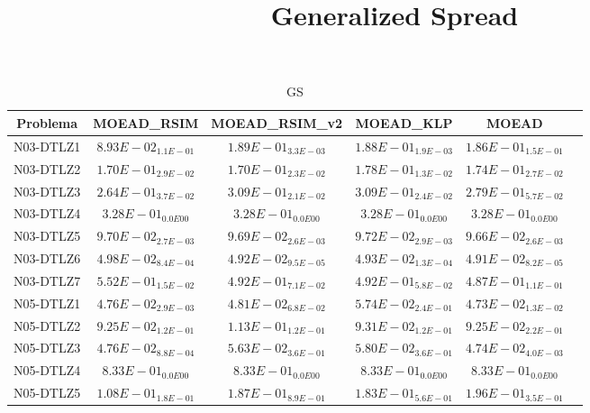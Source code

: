 \documentclass{article}
\title{Generalized Spread}
\author{}
\begin{document}
\maketitle
\begin{table*}[ht!]
\scriptsize
\caption{GS}
\centering\begin{tabular}{|c||c||c||c||c||c|} \hline
Problema &MOEAD_RSIM &MOEAD_RSIM_v2 &MOEAD_KLP &MOEAD\\\hline
N03-DTLZ1 &\cellcolor{gray95}$8.93E-02_{1.1E-01}$ &$1.89E-01_{3.3E-03}$ &$1.88E-01_{1.9E-03}$ &\cellcolor{gray25}$1.86E-01_{1.5E-01}$\\ 
\hline
N03-DTLZ2 &\cellcolor{gray95}$1.70E-01_{2.9E-02}$ &\cellcolor{gray25}$1.70E-01_{2.3E-02}$ &$1.78E-01_{1.3E-02}$ &$1.74E-01_{2.7E-02}$\\ 
\hline
N03-DTLZ3 &\cellcolor{gray95}$2.64E-01_{3.7E-02}$ &$3.09E-01_{2.1E-02}$ &$3.09E-01_{2.4E-02}$ &\cellcolor{gray25}$2.79E-01_{5.7E-02}$\\ 
\hline
N03-DTLZ4 &\cellcolor{gray95}$3.28E-01_{0.0E00}$ &\cellcolor{gray25}$3.28E-01_{0.0E00}$ &$3.28E-01_{0.0E00}$ &$3.28E-01_{0.0E00}$\\ 
\hline
N03-DTLZ5 &$9.70E-02_{2.7E-03}$ &\cellcolor{gray25}$9.69E-02_{2.6E-03}$ &$9.72E-02_{2.9E-03}$ &\cellcolor{gray95}$9.66E-02_{2.6E-03}$\\ 
\hline
N03-DTLZ6 &$4.98E-02_{8.4E-04}$ &\cellcolor{gray25}$4.92E-02_{9.5E-05}$ &$4.93E-02_{1.3E-04}$ &\cellcolor{gray95}$4.91E-02_{8.2E-05}$\\ 
\hline
N03-DTLZ7 &$5.52E-01_{1.5E-02}$ &$4.92E-01_{7.1E-02}$ &\cellcolor{gray25}$4.92E-01_{5.8E-02}$ &\cellcolor{gray95}$4.87E-01_{1.1E-01}$\\ 
\hline
N05-DTLZ1 &\cellcolor{gray25}$4.76E-02_{2.9E-03}$ &$4.81E-02_{6.8E-02}$ &$5.74E-02_{2.4E-01}$ &\cellcolor{gray95}$4.73E-02_{1.3E-02}$\\ 
\hline
N05-DTLZ2 &\cellcolor{gray95}$9.25E-02_{1.2E-01}$ &$1.13E-01_{1.2E-01}$ &$9.31E-02_{1.2E-01}$ &\cellcolor{gray25}$9.25E-02_{2.2E-01}$\\ 
\hline
N05-DTLZ3 &\cellcolor{gray25}$4.76E-02_{8.8E-04}$ &$5.63E-02_{3.6E-01}$ &$5.80E-02_{3.6E-01}$ &\cellcolor{gray95}$4.74E-02_{4.0E-03}$\\ 
\hline
N05-DTLZ4 &\cellcolor{gray95}$8.33E-01_{0.0E00}$ &\cellcolor{gray25}$8.33E-01_{0.0E00}$ &$8.33E-01_{0.0E00}$ &$8.33E-01_{0.0E00}$\\ 
\hline
N05-DTLZ5 &\cellcolor{gray95}$1.08E-01_{1.8E-01}$ &$1.87E-01_{8.9E-01}$ &\cellcolor{gray25}$1.83E-01_{5.6E-01}$ &$1.96E-01_{3.5E-01}$\\ 

\end{tabular}
\end{table*}
\end{document}
